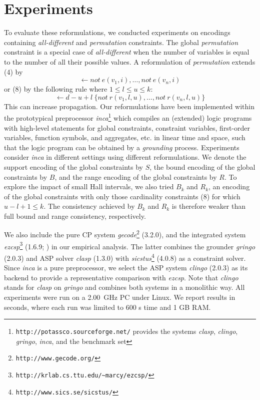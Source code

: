 \documentclass[letterpaper]{article}
\newcommand{\systemname}[1]{\textit{#1}}
\newcommand{\dneg}{not\ }
\newcommand{\encsup}{$S$}
\newcommand{\encbou}{$B$}
\newcommand{\encran}{$R$}
\newcommand{\encbouh}[1]{\encbou$_{#1}$}
\newcommand{\encranh}[1]{\encran$_{#1}$}
\newcommand{\citeay}[1]{\citeauthor{#1} \citeyear{#1}}
\begin{document}
\section{Experiments}
To evaluate these reformulations, we conducted experiments on encodings containing \emph{all-different} and \emph{permutation} constraints.
The global \emph{permutation} constraint is a special case of \emph{all-different} when the number of variables is equal to the number of all their possible values. A reformulation of \emph{permutation} extends (4) by
\[
\leftarrow \dneg e(v_1, i), \dots, \dneg e(v_n, i)
\]
or (8) by the following rule where $1 \leq l \leq u \leq k$:
\[
\leftarrow d-u+l\ \{ \dneg r(v_1, l, u), \dots, \dneg r(v_n, l, u) \}
\]
This can increase propagation.
Our reformulations have been implemented within the prototypical preprocessor \systemname{inca}\footnote{\texttt{http://potassco.sourceforge.net/} provides the systems \systemname{clasp}, \systemname{clingo}, \systemname{gringo}, \systemname{inca}, and the benchmark set} which compiles an (extended) logic programs with high-level statements for global constraints, constraint variables, first-order variables, function symbols, and aggregates, etc. in linear time and space, such that the logic program can be obtained by a \emph{grounding} process.
Experiments consider \systemname{inca} in different settings using different reformulations. We denote the support encoding of the global constraints by \encsup, the bound encoding of the global constraints by \encbou, and the range encoding of the global constraints by \encran. To explore the impact of small Hall intervals, we also tried \encbouh{k} and \encranh{k}, an encoding of the global constraints with only those cardinality constraints (8) for which $u-l+1 \leq k$. The consistency achieved by \encbouh{k} and \encranh{k} is therefore weaker than full bound and range consistency, respectively.

We also include the pure CP system \systemname{gecode}\footnote{\texttt{http://www.gecode.org/}} (3.2.0), and the integrated system \systemname{ezcsp}\footnote{\texttt{http://krlab.cs.ttu.edu/\~{}marcy/ezcsp/}} (1.6.9; \citeay{ba09a}) in our empirical analysis. The latter combines the grounder \systemname{gringo} (2.0.3) and ASP solver \systemname{clasp} (1.3.0) with \systemname{sicstus}\footnote{\texttt{http://www.sics.se/sicstus/}} (4.0.8) as a constraint solver.
Since \systemname{inca} is a pure preprocessor, we select the ASP system \systemname{clingo} (2.0.3) as its backend to provide a representative comparison with \systemname{ezcsp}. Note that \systemname{clingo} stands for \systemname{clasp} on \systemname{gringo} and combines both systems in a monolithic way.
All experiments were run on a 2.00~GHz PC under Linux. We report results in seconds, where each run was limited to 600 s time and 1 GB RAM.
\end{document}
